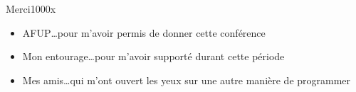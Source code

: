 \begin{frame}{Merci}{1000x}
    \begin{itemize}[<+->]
        \item AFUP\ldots pour m'avoir permis de donner cette conférence
        \item Mon entourage\ldots pour m'avoir supporté durant cette période
        \item Mes amis\ldots qui m'ont ouvert les yeux sur une autre manière de programmer
    \end{itemize}
\end{frame}
